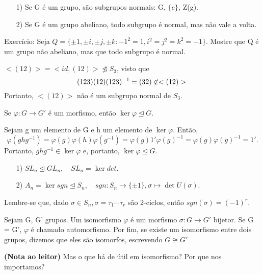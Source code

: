 \documentclass[algebra_notes.tex]{subfiles}
\begin{document}
\begin{example*}
	\begin{itemize}
		\item[1)] Se G é um grupo, são subgrupos normais: G, $\{e\}$, Z(g).
		\item[2)] Se G é um grupo abeliano, todo subgrupo é normal, mas não vale a volta.
	\end{itemize}
\end{example*}
\begin{example*}
	Exercício: Seja $Q = \{\pm1, \pm i, \pm j, \pm k: -1^{2} = 1, i^{2} = j^{2} = k^{2} = -1\}.$ Mostre que Q é um grupo
	não abeliano, mas que todo subgrupo é normal.
\end{example*}
\begin{example*}
	$<(12)> = <id, (12)>\not\trianglelefteq{S_{3}}$, visto que
	$$
		(123)(12)(123)^{-1} = (32)\not\in <(12)>\\
	$$
	Portanto, $<(12)>$ não é um subgrupo normal de $S_{3}.$
\end{example*}
\begin{prop*}
	Se $\varphi:G\rightarrow G'$ é um morfismo, então $\ker{\varphi}\trianglelefteq{G}.$
\end{prop*}
\begin{proof*}
	Sejam g um elemento de G e h um elemento de $\ker{\varphi}$. Então,
	$$
		\varphi(ghg^{-1}) = \varphi(g)\varphi(h)\varphi(g^{-1}) = \varphi(g)1'\varphi(g)^{-1} = \varphi(g)\varphi(g)^{-1} = 1'.
	$$
	Portanto, $ghg^{-1}\in\ker{\varphi}$ e, portanto, $\ker{\varphi}\trianglelefteq{G}.$ \qedsymbol
\end{proof*}
\begin{example*}
	\begin{itemize}
		\item[1)] $SL_{n}\trianglelefteq{GL_{n}}, \quad SL_{n} = \ker{det}.$
		\item[2)] $A_{n} = \ker{sgn}\trianglelefteq{S_{n}}, \quad sgn:S_{n}\rightarrow\{\pm 1\}, \sigma\mapsto \det{U(\sigma)}.$
	\end{itemize}
\end{example*}
Lembre-se que, dado $\sigma\in S_{n}, \sigma = \tau_{1}\cdots\tau_{r}$ são 2-ciclos, então $sgn(\sigma) = (-1)^{r}.$
\begin{def*}
	Sejam G, G' grupos. Um isomorfismo $\varphi$ é um morfismo $\sigma:G\rightarrow G'$ bijetor. Se G = G', $\varphi$ é chamado automorfismo.
	Por fim, se existe um isomorfismo entre dois grupos, dizemos que eles são isomorfos, escrevendo $G\cong G'$
\end{def*}
\textbf{(Nota ao leitor)} Mas o que há de útil em isomorfismo? Por que nos importamos?
\end{document}
